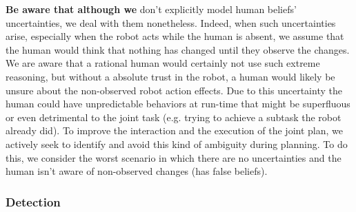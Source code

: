\documentclass[letterpaper]{article} %
\begin{document}
\textbf{Be aware that although we }don't explicitly model human beliefs' uncertainties, we deal with them nonetheless. Indeed, when such uncertainties arise, especially when the robot acts while the human is absent, we assume that the human would think that nothing has changed until they observe the changes. We are aware that a rational human would certainly not use such extreme reasoning, but without a absolute trust in the robot, a human would likely be unsure about the non-observed robot action effects. Due to this uncertainty the human could have unpredictable behaviors at run-time that might be superfluous or even detrimental to the joint task (e.g. trying to achieve a subtask the robot already did).
To improve the interaction and the execution of the joint plan, we actively seek to identify and avoid this kind of ambiguity during planning. To do this, we consider the worst scenario in which there are no uncertainties and the human isn't aware of non-observed changes (has false beliefs).

\subsubsection{Detection}


\end{document}
